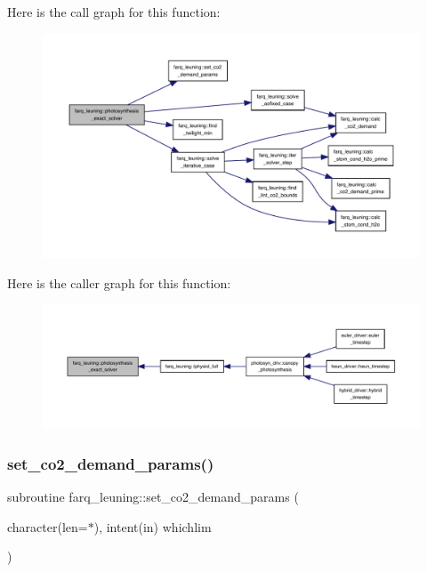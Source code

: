 Here is the call graph for this function\+:
\nopagebreak
\begin{figure}[H]
\begin{center}
\leavevmode
\includegraphics[width=350pt]{namespacefarq__leuning_a874ab59c974d12da5a8ea01c48dd089c_cgraph}
\end{center}
\end{figure}
Here is the caller graph for this function\+:
\nopagebreak
\begin{figure}[H]
\begin{center}
\leavevmode
\includegraphics[width=350pt]{namespacefarq__leuning_a874ab59c974d12da5a8ea01c48dd089c_icgraph}
\end{center}
\end{figure}
\mbox{\label{namespacefarq__leuning_a7a8d111e1aa61a24fdbd7e96f67967e0}} 
\subsubsection{\texorpdfstring{set\+\_\+co2\+\_\+demand\+\_\+params()}{set\_co2\_demand\_params()}}
{\footnotesize\ttfamily subroutine farq\+\_\+leuning\+::set\+\_\+co2\+\_\+demand\+\_\+params (\begin{DoxyParamCaption}\item[{character(len=$\ast$), intent(in)}]{whichlim }\end{DoxyParamCaption})}

